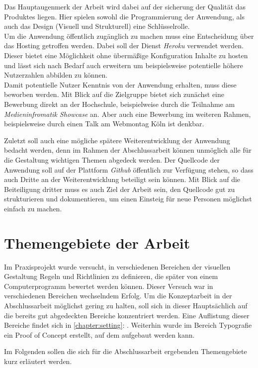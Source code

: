 Das Hauptaugenmerk der Arbeit wird dabei auf der sicherung der Qualität das Produktes liegen. Hier spielen sowohl die Programmierung der Anwendung, als auch das Design (Visuell und Strukturell) eine Schlüsselrolle. \\
Um die Anwendung öffentlich zugänglich zu machen muss eine Entscheidung über das Hosting getroffen werden. Dabei soll der Dienst \textit{Heroku} verwendet werden. Dieser bietet eine Möglichkeit ohne übermäßige Konfiguration Inhalte zu hosten und lässt sich nach Bedarf auch erweitern um beispielsweise potentielle höhere Nutzerzahlen abbilden zu können. \\
Damit potentielle Nutzer Kenntnis von der Anwendung erhalten, muss diese beworben werden. Mit Blick auf die Zielgruppe bietet sich zunächst eine Bewerbung direkt an der Hochschule, beispielweise durch die Teilnahme am \textit{Medieninfromatik Showcase} an. Aber auch eine Bewerbung im weiteren Rahmen, beispielsweise durch einen Talk am Webmontag Köln ist denkbar.

Zuletzt soll auch eine mögliche spätere Weiterentwicklung der Anwendung bedacht werden, denn im Rahmen der Abschlussarbeit können unmöglich alle für die Gestaltung wichtigen Themen abgedeck werden. Der Quellcode der Anwendung soll auf der Plattform \textit{Github} öffentlich zur Verfügung stehen, so dass auch Dritte an der Weiterentwicklung beteiligt sein können. Mit Blick auf die Beiteiligung dritter muss es auch Ziel der Arbeit sein, den Quellcode gut zu strukturieren und dokumentieren, um einen Einsteig für neue Personen möglichst einfach zu machen.

\section{Themengebiete der Arbeit}
Im Praxisprojekt wurde versucht, in verschiedenen Bereichen der visuellen Gestaltung Regeln und Richtlinien zu definieren, die später von einem Computerprogramm bewertet werden können. Dieser Versuch war in verschiedenen Bereichen wechselndem Erfolg. Um die Konzeptarbeit in der Abschlussarbeit möglichst gering zu halten, soll sich in dieser Hauptsächlich auf die bereits gut abgedeckten Bereiche konzentriert werden. Eine Auflistung dieser Bereiche findet sich in \autoref{chapter:setting}: \textit{}.
Weiterhin wurde im Bereich Typografie ein Proof of Concept erstellt, auf dem aufgebaut werden kann.

Im Folgenden sollen die sich für die Abschlussarbeit ergebenden Themengebiete kurz erläutert werden.

